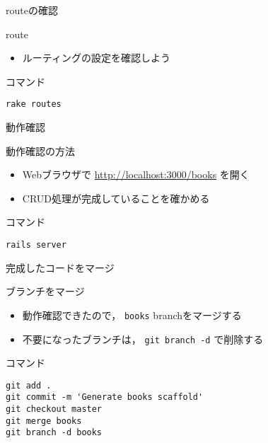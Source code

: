 \documentclass[t, aspectratio=169]{beamer}
\begin{document}
\begin{frame}[fragile,label=sec-7-1-3]{routeの確認}
 \begin{block}{route}
\begin{itemize}
\item ルーティングの設定を確認しよう
\end{itemize}
\end{block}

\begin{block}{コマンド}
\begin{verbatim}
rake routes
\end{verbatim}
\end{block}
\end{frame}
\begin{frame}[fragile,label=sec-7-1-4]{動作確認}
 \begin{block}{動作確認の方法}
\begin{itemize}
\item Webブラウザで \url{http://localhost:3000/books} を開く
\item CRUD処理が完成していることを確かめる
\end{itemize}
\end{block}

\begin{block}{コマンド}
\begin{verbatim}
rails server
\end{verbatim}
\end{block}
\end{frame}
\begin{frame}[fragile,label=sec-7-1-5]{完成したコードをマージ}
 \begin{block}{ブランチをマージ}
\begin{itemize}
\item 動作確認できたので， \texttt{books} branchをマージする
\item 不要になったブランチは， \texttt{git branch -d} で削除する
\end{itemize}
\end{block}

\begin{block}{コマンド}
\begin{verbatim}
git add .
git commit -m 'Generate books scaffold'
git checkout master
git merge books
git branch -d books
\end{verbatim}
\end{block}
\end{frame}
\end{document}
